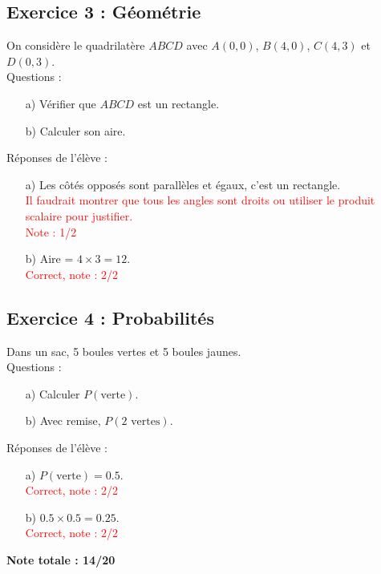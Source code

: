 \documentclass{article}
\begin{document}
\subsection*{Exercice 3 : Géométrie}
On considère le quadrilatère $ABCD$ avec $A(0,0)$, $B(4,0)$, $C(4,3)$ et $D(0,3)$. \\
Questions :
\begin{enumerate}
    \item[a)] Vérifier que $ABCD$ est un rectangle.
    \item[b)] Calculer son aire.
\end{enumerate}

Réponses de l’élève :
\begin{enumerate}
    \item[a)] Les côtés opposés sont parallèles et égaux, c’est un rectangle.\\
    \textcolor{red}{Il faudrait montrer que tous les angles sont droits ou utiliser le produit scalaire pour justifier.} \\
    \textcolor{red}{Note : 1/2}

    \item[b)] Aire = $4 \times 3 = 12$. \\
    \textcolor{red}{Correct, note : 2/2}
\end{enumerate}

\subsection*{Exercice 4 : Probabilités}
Dans un sac, 5 boules vertes et 5 boules jaunes. \\
Questions :
\begin{enumerate}
    \item[a)] Calculer $P(\text{verte})$.
    \item[b)] Avec remise, $P(2 \text{ vertes})$.
\end{enumerate}

Réponses de l’élève :
\begin{enumerate}
    \item[a)] $P(\text{verte}) = 0.5$. \\
    \textcolor{red}{Correct, note : 2/2}
    
    \item[b)] $0.5 \times 0.5 = 0.25$. \\
    \textcolor{red}{Correct, note : 2/2}
\end{enumerate}

\textbf{Note totale : 14/20}
\end{document}
